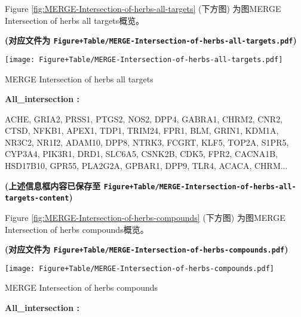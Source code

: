 \documentclass[
]{article}
\begin{document}
Figure \ref{fig:MERGE-Intersection-of-herbs-all-targets} (下方图) 为图MERGE Intersection of herbs all targets概览。

\textbf{(对应文件为 \texttt{Figure+Table/MERGE-Intersection-of-herbs-all-targets.pdf})}

\def\@captype{figure}
\begin{center}
\texttt{[image: Figure+Table/MERGE-Intersection-of-herbs-all-targets.pdf]}
\caption{MERGE Intersection of herbs all targets}\label{fig:MERGE-Intersection-of-herbs-all-targets}
\end{center}
\begin{center}\begin{tcolorbox}[colback=gray!10, colframe=gray!50, width=0.9\linewidth, arc=1mm, boxrule=0.5pt]
\textbf{
All\_intersection
:}

\vspace{0.5em}

    ACHE, GRIA2, PRSS1, PTGS2, NOS2, DPP4, GABRA1, CHRM2,
CNR2, CTSD, NFKB1, APEX1, TDP1, TRIM24, FPR1, BLM, GRIN1,
KDM1A, NR3C2, NR1I2, ADAM10, DPP8, NTRK3, FCGRT, KLF5,
TOP2A, S1PR5, CYP3A4, PIK3R1, DRD1, SLC6A5, CSNK2B, CDK5,
FPR2, CACNA1B, HSD17B10, GPR55, PLA2G2A, GPBAR1, DPP9,
TLR4, ACACA, CHRM...

\vspace{2em}
\end{tcolorbox}
\end{center}

\textbf{(上述信息框内容已保存至 \texttt{Figure+Table/MERGE-Intersection-of-herbs-all-targets-content})}

Figure \ref{fig:MERGE-Intersection-of-herbs-compounds} (下方图) 为图MERGE Intersection of herbs compounds概览。

\textbf{(对应文件为 \texttt{Figure+Table/MERGE-Intersection-of-herbs-compounds.pdf})}

\def\@captype{figure}
\begin{center}
\texttt{[image: Figure+Table/MERGE-Intersection-of-herbs-compounds.pdf]}
\caption{MERGE Intersection of herbs compounds}\label{fig:MERGE-Intersection-of-herbs-compounds}
\end{center}
\begin{center}\begin{tcolorbox}[colback=gray!10, colframe=gray!50, width=0.9\linewidth, arc=1mm, boxrule=0.5pt]
\textbf{
All\_intersection
:}

\vspace{0.5em}



\vspace{2em}
\end{tcolorbox}
\end{center}
\end{document}
